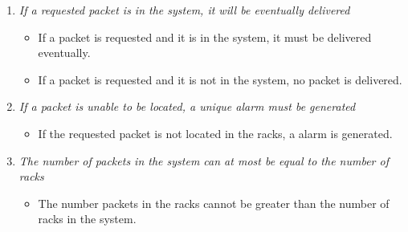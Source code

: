\begin{enumerate}
\item \textit{If a requested packet is in the system, it will be
	eventually delivered}
	\begin{itemize}
	\item If a packet is requested and it is in the system, it must be
	delivered eventually.
	\item If a packet is requested and it is not in the system, no 
	packet is delivered.
	\end{itemize}
	
\item \textit{If a packet is unable to be located, a unique alarm must 
	be generated}
	\begin{itemize}	
	\item If the requested packet is not located in the racks, a alarm
	is generated.
	\end{itemize}
		
\item \textit{The number of packets in the system can at most be equal to the number of racks}
	\begin{itemize}
	\item The number packets in the racks cannot be greater than the 
	number of racks in the system.
	\end{itemize}
\end{enumerate}
